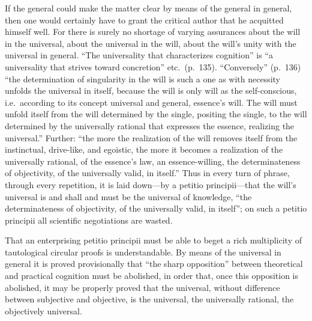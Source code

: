 \documentclass[12pt]{book}
\newcommand{\opage}[1]{\marginnote{\footnotesize\textit{[#1]}}}
\begin{document}
If the general could make the matter clear by means of the general in
general, then one would certainly have to grant the critical author
that he acquitted himself well. For there is surely no shortage of
varying assurances about the will in the universal, about the universal
in the will, about the will's unity with the universal in general. ``The
universality that characterizes cognition'' is ``a universality that
strives toward concretion'' etc.\ (p.\ 135). ``Conversely'' (p.\ 136)
``the determination of singularity in the will is such a one as with
necessity unfolds the universal in itself,
\opage{22}\setcounter{footnote}{0}%
because the will is only will as the self-conscious, i.e.\ according to
its concept universal and general, essence's will. The will must unfold
itself from the will determined by the single, positing the single, to
the will determined by the universally rational that expresses the
essence, realizing the universal.'' Further: ``the more the realization
of the will removes itself from the instinctual, drive-like, and
egoistic, the more it becomes a realization of the universally rational,
of the essence's law, an essence-willing, the determinateness of
objectivity, of the universally valid, in itself.'' Thus in every turn of
phrase, through every repetition, it is laid down---by a petitio
principii---that the will's universal is and shall and must be the
universal of knowledge, ``the determinateness of objectivity, of the
universally valid, in itself''; on such a petitio principii all
scientific negotiations are wasted.

That an enterprising petitio principii must be able to beget a rich
multiplicity of tautological circular proofs is understandable. By means
of the universal in general it is proved provisionally that ``the sharp
opposition'' between theoretical and practical cognition must be
abolished, in order that, once this opposition is abolished, it may be
properly proved that the universal, without difference between subjective
and objective, is the universal, the universally rational, the
objectively universal.
\end{document}
